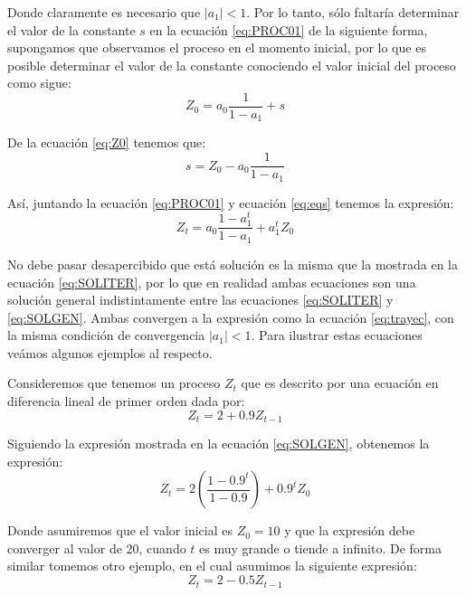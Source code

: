 \documentclass[
]{book}
\begin{document}
Donde claramente es necesario que \(|a_1| < 1\). Por lo tanto, sólo faltaría determinar el valor de la constante \(s\) en la ecuación \eqref{eq:PROC01} de la siguiente forma, supongamos que observamos el proceso en el momento inicial, por lo que es posible determinar el valor de la constante conociendo el valor inicial del proceso como sigue:
\begin{equation}
    Z_0 = a_0 \frac{1}{1 - a_1} + s
\label{eq:Z0}
\end{equation}

De la ecuación \eqref{eq:Z0} tenemos que:
\begin{equation}
    s = Z_0 - a_0 \frac{1}{1 - a_1}
\label{eq:eqs}
\end{equation}

Así, juntando la ecuación \eqref{eq:PROC01} y ecuación \eqref{eq:eqs} tenemos la expresión:
\begin{equation}
    Z_t = a_0 \frac{1 - a^t_1}{1 - a_1} + a^t_1 Z_0
\label{eq:SOLGEN}
\end{equation}

No debe pasar desapercibido que está solución es la misma que la mostrada en la ecuación \eqref{eq:SOLITER}, por lo que en realidad ambas ecuaciones son una solución general indistintamente entre las ecuaciones \eqref{eq:SOLITER} y \eqref{eq:SOLGEN}. Ambas convergen a la expresión como la ecuación \eqref{eq:trayec}, con la misma condición de convergencia \(|a_1| < 1\). Para ilustrar estas ecuaciones veámos algunos ejemplos al respecto.

Consideremos que tenemos un proceso \(Z_t\) que es descrito por una ecuación en diferencia lineal de primer orden dada por:
\begin{equation}
    Z_t = 2 + 0.9 Z_{t-1}
\label{eq:ex1}
\end{equation}

Siguiendo la expresión mostrada en la ecuación \eqref{eq:SOLGEN}, obtenemos la expresión:
\begin{equation}
    Z_t = 2 \left( \frac{1 - 0.9^{t}}{1 - 0.9} \right) + 0.9^t Z_0
\label{eq:ex2}
\end{equation}

Donde asumiremos que el valor inicial es \(Z_0 = 10\) y que la expresión debe converger al valor de 20, cuando \(t\) es muy grande o tiende a infinito. De forma similar tomemos otro ejemplo, en el cual asumimos la siguiente expresión:
\begin{equation}
    Z_t = 2 - 0.5 Z_{t-1}
\label{eq:ex3}
\end{equation}
\end{document}

